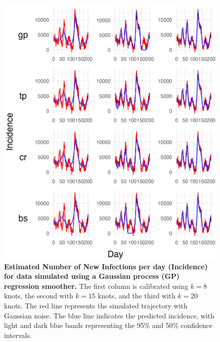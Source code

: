 \documentclass[
11pt, %
oneside, %
english, %
singlespacing, %
]{macthesis} %
\begin{document}
\begin{figure}[H]
\centering
\includegraphics[width=\textwidth]{figure/Simulated/simulation_gp(-2,2,1)_k(20)_k(8,15,20)_bsd2_beta2_plot_incidence.png}
\caption[Predicted Simulated Data (GP) Incidence]{\textbf{Estimated Number of New Infections per day (Incidence) for data simulated using a Gaussian process (GP) regression smoother.} The first column is calibrated using \(k=8\) knots, the second with \(k=15\) knots, and the third with \(k=20\) knots. The red line represents the simulated trajectory with Gaussian noise. The blue line indicates the predicted incidence, with light and dark blue bands representing the 95\% and 50\% confidence intervals.}
\label{fig:incidence20gp}
\end{figure}
\end{document}
